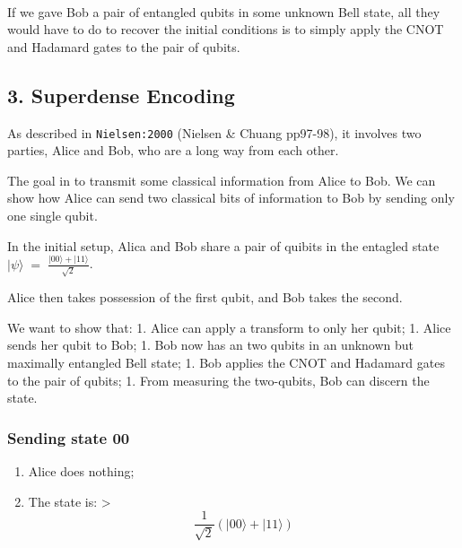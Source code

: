             
    
    \begin{center}
    \end{center}
    { \hspace*{\fill} \\}
    

    If we gave Bob a pair of entangled qubits in some unknown Bell state,
all they would have to do to recover the initial conditions is to simply
apply the CNOT and Hadamard gates to the pair of qubits.

\hypertarget{superdense-encoding}{%
\subsection*{3. Superdense Encoding}\label{superdense-encoding}}

As described in \texttt{Nielsen:2000} (Nielsen \& Chuang pp97-98), it
involves two parties, Alice and Bob, who are a long way from each other.

The goal in to transmit some classical information from Alice to Bob. We
can show how Alice can send two classical bits of information to Bob by
sending only one single qubit.

In the initial setup, Alica and Bob share a pair of quibits in the
entagled state
\(\lvert \psi\rangle \;=\; \frac{\lvert 00 \rangle + \lvert 11\rangle}{\sqrt{2}}\).

Alice then takes possession of the first qubit, and Bob takes the
second.

We want to show that: 1. Alice can apply a transform to only her qubit;
1. Alice sends her qubit to Bob; 1. Bob now has an two qubits in an
unknown but maximally entangled Bell state; 1. Bob applies the CNOT and
Hadamard gates to the pair of qubits; 1. From measuring the two-qubits,
Bob can discern the state.

\hypertarget{sending-state-00}{%
\subsubsection*{Sending state 00}\label{sending-state-00}}

\begin{enumerate}
\def\labelenumi{\arabic{enumi}.}
\tightlist
\item
  Alice does nothing;
\item
  The state is: \textgreater{}
  \[\frac{1}{\sqrt{2}}(\lvert 00\rangle + \lvert 11 \rangle)\]
\end{enumerate}

